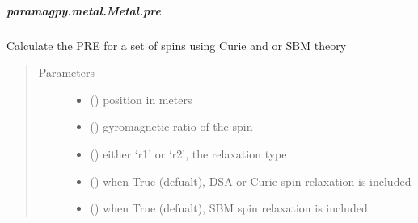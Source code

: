 \documentclass[a4paper,10pt,english,openany,oneside]{sphinxmanual}
\begin{document}
\begin{fulllineitems}
\begin{fulllineitems}
\begin{fulllineitems}
\end{fulllineitems}



\subparagraph{paramagpy.metal.Metal.pre}
\label{\detokenize{reference/generated/paramagpy.metal.Metal.pre:paramagpy-metal-metal-pre}}\label{\detokenize{reference/generated/paramagpy.metal.Metal.pre::doc}}

\begin{fulllineitems}
\label{\detokenize{reference/generated/paramagpy.metal.Metal.pre:paramagpy.metal.Metal.pre}}
Calculate the PRE for a set of spins using Curie and or SBM theory
\begin{quote}\begin{description}
\item[{Parameters}] \leavevmode\begin{itemize}
\item {} 
 () \textendash{} position in meters

\item {} 
 () \textendash{} gyromagnetic ratio of the spin

\item {} 
 () \textendash{} either ‘r1’ or ‘r2’, the relaxation type

\item {} 
 (\sphinxstyleliteralemphasis{\sphinxupquote{ (}}\sphinxstyleliteralemphasis{\sphinxupquote{)}}) \textendash{} when True (defualt), DSA or Curie spin relaxation is included

\item {} 
 (\sphinxstyleliteralemphasis{\sphinxupquote{ (}}\sphinxstyleliteralemphasis{\sphinxupquote{)}}) \textendash{} when True (defualt), SBM spin relaxation is included


\end{itemize}
\end{description}
\end{quote}
\end{fulllineitems}
\end{fulllineitems}
\end{fulllineitems}
\end{document}
